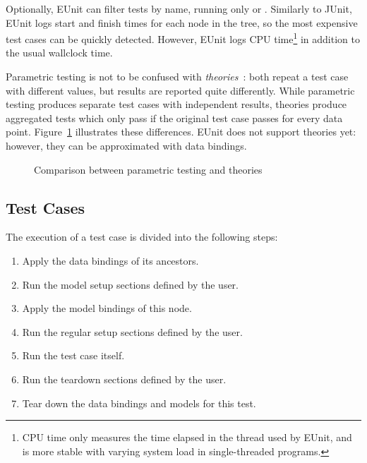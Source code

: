 Optionally, EUnit can filter tests by name, running only  or . Similarly to JUnit, EUnit logs start and finish times for each node in the tree, so the most expensive test cases can be quickly detected. However, EUnit logs CPU time\footnote{CPU time only measures the time elapsed in the thread used by EUnit, and is more stable with varying system load in single-threaded programs.} in addition to the usual wallclock time.

Parametric testing is not to be confused with \emph{theories}~\cite{Saff2007}: both repeat a test case with different values, but results are reported quite differently. While parametric testing produces separate test cases with independent results, theories produce aggregated tests which only pass if the original test case passes for every data point. Figure~\ref{fig:parametric-vs-theories} illustrates these differences. EUnit does not support theories yet: however, they can be approximated with data bindings.

\begin{figure}
  \centering
  \subbottom[Theories]{
    \newcommand{\typea}{test}
    \newcommand{\typeb}{data}
    
  }
  \caption{Comparison between parametric testing and theories}
  \label{fig:parametric-vs-theories}
\end{figure}

\subsection{Test Cases}
\label{sec:eunit-test-cases}

The execution of a test case is divided into the following steps:
\begin{enumerate}
\item Apply the data bindings of its ancestors.
\item Run the model setup sections defined by the user.
\item Apply the model bindings of this node.
\item Run the regular setup sections defined by the user.
\item Run the test case itself.
\item Run the teardown sections defined by the user.
\item Tear down the data bindings and models for this test.
\end{enumerate}

